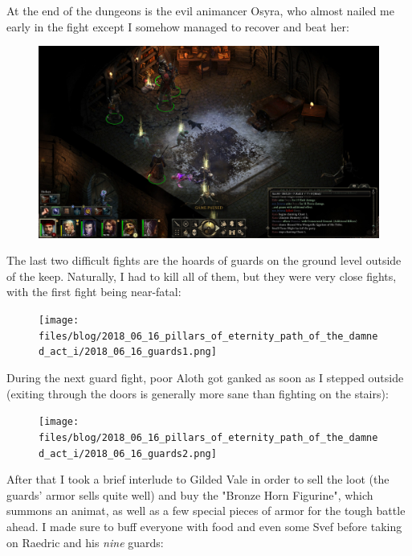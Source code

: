 \documentclass{article}
\begin{document}
At the end of the dungeons is the evil animancer Osyra, who almost nailed me early in the fight except I somehow managed to recover and beat her:

\begin{figure}
\includegraphics[scale=0.33]{files/blog/2018_06_16_pillars_of_eternity_path_of_the_damned_act_i/2018_06_16_osyra.jpg}
\end{figure}

The last two difficult fights are the hoards of guards on the ground level outside of the keep.  Naturally, I had to kill all of them, but they were very close fights, with the first fight being near-fatal:

\begin{figure}
\texttt{[image: files/blog/2018\_06\_16\_pillars\_of\_eternity\_path\_of\_the\_damned\_act\_i/2018\_06\_16\_guards1.png]}
\end{figure}

During the next guard fight, poor Aloth got ganked as soon as I stepped outside (exiting through the doors is generally more sane than fighting on the stairs):

\begin{figure}
\texttt{[image: files/blog/2018\_06\_16\_pillars\_of\_eternity\_path\_of\_the\_damned\_act\_i/2018\_06\_16\_guards2.png]}
\end{figure}

After that I took a brief interlude to Gilded Vale in order to sell the loot (the guards' armor sells quite well) and buy the "Bronze Horn Figurine", which summons an animat, as well as a few special pieces of armor for the tough battle ahead.  I made sure to buff everyone with food and even some Svef before taking on Raedric and his \emph{nine} guards:
\end{document}
